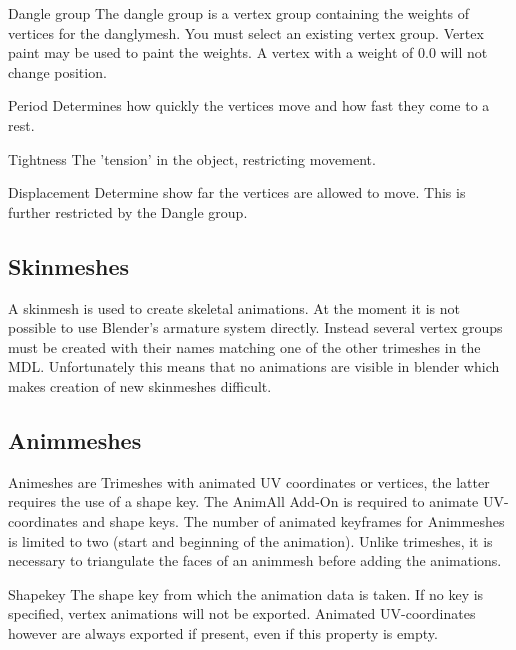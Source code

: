 \begin{propertyAurora}{Dangle group} 
The dangle group is a vertex group containing the weights of vertices for the danglymesh. 
You must select an existing vertex group. Vertex paint may be used to paint the weights. A vertex with a weight of
0.0 will not change position.
\end{propertyAurora}

\begin{propertyAurora}{Period} 
Determines how quickly the vertices move and how fast they come to a rest.
\end{propertyAurora}
\begin{propertyAurora}{Tightness} 
The 'tension' in the object, restricting movement. 
\end{propertyAurora}
\begin{propertyAurora}{Displacement} 
Determine show far the vertices are allowed to move. This is further restricted by the Dangle group.
\end{propertyAurora}


\subsection{Skinmeshes}
A skinmesh is used to create skeletal animations. At the moment it is not 
possible to use Blender's armature system directly. Instead several vertex groups 
must be created with their names matching one of the other trimeshes in the MDL. 
Unfortunately this means that no animations are visible in blender which makes
creation of new skinmeshes difficult.


\subsection{Animmeshes}
Animeshes are Trimeshes with animated UV coordinates or vertices, the latter requires the use of a 
shape key. The AnimAll Add-On is required to animate UV-coordinates and shape keys. The number of 
animated keyframes for Animmeshes is limited to two (start and beginning of the animation). Unlike 
trimeshes, it is necessary to triangulate the faces of an animmesh before adding the animations. 

\begin{propertyAurora}{Shapekey} 
    The shape key from which the animation data is taken. If no key is specified, vertex animations will
    not be exported. Animated UV-coordinates however are always exported if present, even 
    if this property is empty.
\end{propertyAurora}

